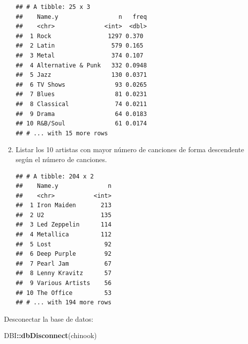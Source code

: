 \documentclass[]{book}
\newenvironment{Shaded}{\begin{snugshade}}{\end{snugshade}}
\newcommand{\KeywordTok}[1]{\textcolor[rgb]{0.13,0.29,0.53}{\textbf{#1}}}
\newcommand{\DataTypeTok}[1]{\textcolor[rgb]{0.13,0.29,0.53}{#1}}
\newcommand{\StringTok}[1]{\textcolor[rgb]{0.31,0.60,0.02}{#1}}
\newcommand{\OperatorTok}[1]{\textcolor[rgb]{0.81,0.36,0.00}{\textbf{#1}}}
\newcommand{\NormalTok}[1]{#1}
\begin{document}
\begin{enumerate}
\begin{verbatim}
## # A tibble: 25 x 3
##    Name.y                 n   freq
##    <chr>              <int>  <dbl>
##  1 Rock                1297 0.370 
##  2 Latin                579 0.165 
##  3 Metal                374 0.107 
##  4 Alternative & Punk   332 0.0948
##  5 Jazz                 130 0.0371
##  6 TV Shows              93 0.0265
##  7 Blues                 81 0.0231
##  8 Classical             74 0.0211
##  9 Drama                 64 0.0183
## 10 R&B/Soul              61 0.0174
## # ... with 15 more rows
\end{verbatim}
\item
  Listar los 10 artistas con mayor número de canciones de forma
  descendente según el número de canciones.

\begin{Shaded}
\end{Shaded}

\begin{verbatim}
## # A tibble: 204 x 2
##    Name.y              n
##    <chr>           <int>
##  1 Iron Maiden       213
##  2 U2                135
##  3 Led Zeppelin      114
##  4 Metallica         112
##  5 Lost               92
##  6 Deep Purple        92
##  7 Pearl Jam          67
##  8 Lenny Kravitz      57
##  9 Various Artists    56
## 10 The Office         53
## # ... with 194 more rows
\end{verbatim}
\end{enumerate}

Desconectar la base de datos:

\begin{Shaded}
\begin{Highlighting}[]
\NormalTok{DBI}\OperatorTok{::}\KeywordTok{dbDisconnect}\NormalTok{(chinook)            }
\end{Highlighting}
\end{Shaded}
\end{document}
